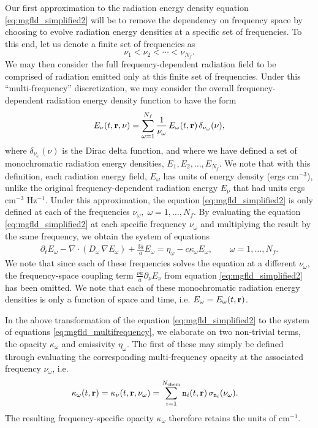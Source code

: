 \documentclass[10pt]{article}
\renewcommand{\(}{\left(}
\renewcommand{\)}{\right)}
\newcommand{\rvec}{{\bf r}}
\newcommand{\adot}{\dot{a}}
\newcommand{\Enu}{E_{\nu}}
\newcommand{\mn}{{\tt n}}
\begin{document}
Our first approximation to the radiation energy density equation
\eqref{eq:mgfld_simplified2} will be to remove the dependency on
frequency space by choosing to evolve radiation energy densities at a
specific set of frequencies.  To this end, let us denote a finite set
of frequencies as
\begin{equation}
\label{eq:multifrequency_frequencies}
  \nu_1 < \nu_2 < \cdots < \nu_{N_f}.
\end{equation}
We may then consider the full frequency-dependent radiation field to
be comprised of radiation emitted only at this finite set of
frequencies.  Under this ``multi-frequency'' discretization, we may
consider the overall frequency-dependent radiation energy density
function to have the form 
\begin{equation}
\label{eq:multifrequency_radiation}
  \Enu(t,\rvec,\nu) = \sum_{\omega=1}^{N_f} \frac{1}{\nu_{\omega}}\,E_{\omega}(t,\rvec)\, \delta_{\nu_{\omega}}(\nu),
\end{equation}
where $\delta_{\nu_{\omega}}(\nu)$ is the Dirac delta function, and where we
have defined a set of monochromatic radiation energy densities, $E_1,
E_2, \ldots, E_{N_f}$.  We note that with this definition, each
radiation energy field, $E_{\omega}$ has units of energy density (ergs 
cm$^{-3}$), unlike the original frequency-dependent radiation energy
$\Enu$ that had units ergs cm$^{-3}$ Hz$^{-1}$.
Under this approximation, the equation \eqref{eq:mgfld_simplified2} is
only defined at each of the frequencies $\nu_{\omega},\; 
\omega=1,\ldots,N_f$.  By evaluating the equation
\eqref{eq:mgfld_simplified2} at each specific frequency $\nu_{\omega}$
and multiplying the result by the same frequency, we obtain the system
of equations
\begin{align}
  \label{eq:mgfld_multifrequency}
  \partial_{t} E_{\omega} - \nabla\cdot(D_{\omega}\,\nabla E_{\omega}) + \frac{3 \adot}{a}
  E_{\omega} = \eta_{\omega} - c \kappa_{\omega} E_{\omega}, \qquad \omega=1,\ldots,N_f.
\end{align}
We note that since each of these frequencies solves the equation at a
different $\nu_{\omega}$, the frequency-space coupling term 
$\frac{\nu \adot}{a}\partial_{\nu}\Enu$ from equation
\eqref{eq:mgfld_simplified2} has been omitted.
We note that each of these monochromatic radiation energy densities is
only a function of space and time, i.e. $E_{\omega} = E_{\omega}(t,\rvec)$.

In the above transformation of the equation
\eqref{eq:mgfld_simplified2} to the system of equations
\eqref{eq:mgfld_multifrequency}, we elaborate on two non-trivial
terms, the opacity $\kappa_{\omega}$ and emissivity $\eta_{\omega}$. 
The first of these may simply be defined through evaluating the
corresponding multi-frequency opacity at the associated frequency
$\nu_{\omega}$, i.e.
\begin{align}
\label{eq:multifrequency_opacity}
  \kappa_{\omega}(t,\rvec) &= \kappa_{\nu}(t,\rvec,\nu_{\omega}) = \sum_{i=1}^{N_\text{chem}} \mn_i(t,\rvec)\, \sigma_{\mn_i} (\nu_{\omega}).
\end{align}
The resulting frequency-specific opacity $\kappa_{\omega}$ therefore
retains the units of cm$^{-1}$.
\end{document}
